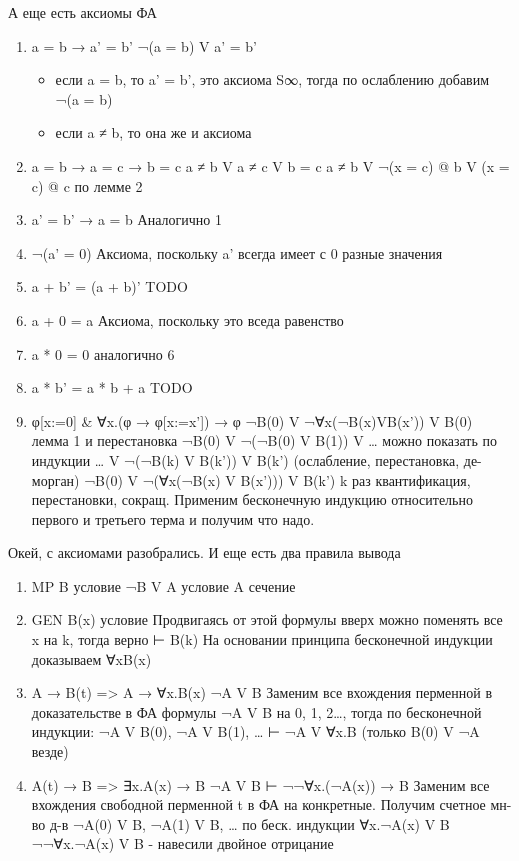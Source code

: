 \documentclass[11pt]{article}
\begin{document}
А еще есть аксиомы ФА
\begin{enumerate}
\item a = b → a' = b'
¬(a = b) V a' = b'
\begin{itemize}
\item если a = b, то a' = b', это аксиома S∞,
тогда по ослаблению добавим ¬(a = b)
\item если a ≠ b, то она же и аксиома
\end{itemize}
\item a = b → a = c → b = c
a ≠ b V a ≠ c V b = c
a ≠ b V ¬(x = c) @ b V (x = c) @ c     по лемме 2
\item a' = b' → a = b
Аналогично 1
\item ¬(a' = 0)
Аксиома, поскольку a' всегда имеет с 0 разные значения
\item a + b' = (a + b)'
TODO
\item a + 0 = a
Аксиома, поскольку это вседа равенство
\item a * 0 = 0
аналогично 6
\item a * b' = a * b + a
TODO
\item φ[x:=0] \& ∀x.(φ → φ[x:=x']) → φ
¬B(0) V ¬∀x(¬B(x)VB(x')) V B(0)         лемма 1 и перестановка
¬B(0) V ¬(¬B(0) V B(1)) V \ldots{}           можно показать по индукции
\ldots{} V ¬(¬B(k) V B(k')) V B(k')   (ослабление, перестановка, де-морган)
¬B(0) V ¬(∀x(¬B(x) V B(x'))) V B(k')    k раз квантификация, перестановки, сокращ.
Применим бесконечную индукцию относительно первого
и третьего терма и получим что надо.
\end{enumerate}

Окей, с аксиомами разобрались.
И еще есть два правила вывода
\begin{enumerate}
\item MP
B            условие
¬B V A       условие
A            сечение
\item GEN
B(x)         условие
Продвигаясь от этой формулы вверх можно поменять все
x на k, тогда верно
⊢ B(k)
На основании принципа бесконечной индукции доказываем ∀xB(x)
\item A → B(t) => A → ∀x.B(x)
¬A V B
Заменим все вхождения перменной в доказательстве в
ФА формулы ¬A V B на 0, 1, 2\ldots{},
тогда по бесконечной индукции:
¬A V B(0), ¬A V B(1), \ldots{} ⊢ ¬A V ∀x.B   (только B(0) V ¬A везде)
\item A(t) → B => ∃x.A(x) → B
¬A V B ⊢ ¬¬∀x.(¬A(x)) → B
Заменим все вхождения свободной перменной t в ФА на конкретные.
Получим счетное мн-во д-в ¬A(0) V B, ¬A(1) V B, \ldots{}
по беск. индукции
∀x.¬A(x) V B
¬¬∀x.¬A(x) V B -  навесили двойное отрицание
\end{enumerate}
\end{document}
